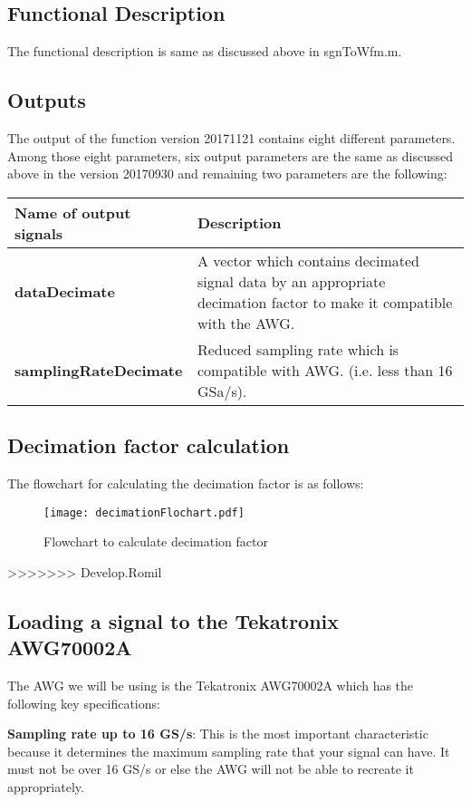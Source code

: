 \subsection*{Functional Description}
The functional description is same as discussed above in sgnToWfm.m.

\subsection*{Outputs}
The output of the function version 20171121 contains eight different parameters. Among those eight parameters, six output parameters are the same as discussed above in the version 20170930 and remaining two parameters are the following:

\begin{center}
	\begin{tabular}{ |p{4.5cm}||p{10cm}|   }
		\hline
		\textbf{Name of output signals} & \textbf{Description}\\
		\hline
		\hline
		\centering \textbf{dataDecimate}	& A vector which contains decimated signal data by an appropriate decimation factor to make it compatible with the AWG.\\
		\hline
		\centering \textbf{samplingRateDecimate}	& Reduced sampling rate which is compatible with AWG. (i.e. less than 16 GSa/s).\\		
		\hline
	\end{tabular}
\end{center}
\newpage
\subsection*{Decimation factor calculation}
The flowchart for calculating the decimation factor is as follows:


\begin{figure}[h]
	\centering
	\texttt{[image: decimationFlochart.pdf]}
	\label{decimation_Flowchart}\caption{Flowchart to calculate decimation factor}
\end{figure}
>>>>>>> Develop.Romil

\subsection{Loading a signal to the Tekatronix AWG70002A}

The AWG we will be using is the Tekatronix AWG70002A which has the following key specifications:
\bigskip

\textbf{Sampling rate up to 16 GS/s}: This is the most important characteristic  because it determines the maximum sampling rate that your signal can have. It must not be over 16 GS/s or else the AWG will not be able to recreate it appropriately.
\bigskip

